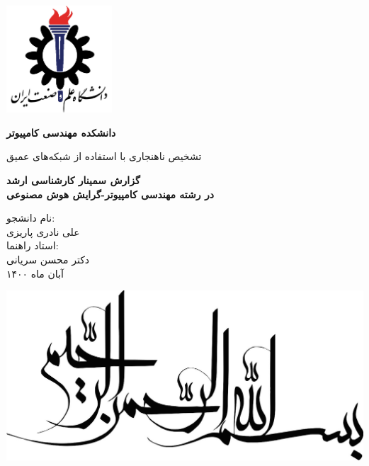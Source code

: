 \documentclass[12pt,a4paper]{article}
\theoremstyle{definition}
\theoremstyle{theorem}
\theoremstyle{definition}
\begin{document}
	\thispagestyle{empty}
	\vspace*{-25mm}
	\centerline{\includegraphics[height=4cm]{./images/logos/iust.png}}

	\begin{center}
	\textbf{
		دانشکده مهندسی کامپیوتر
	}
	\\[1cm]
	\baselineskip=2cm
	{\titr
	\begin{Huge}
	تشخیص ناهنجاری با استفاده از شبکه‌های عمیق\\[1cm]
	\end{Huge}}
	{\Large 
		\textbf{
			گزارش سمینار کارشناسی ارشد\\
			در رشته مهندسی کامپیوتر-گرایش هوش مصنوعی
		} \\[1cm]
	}

	{\Large {\traffic 
	نام دانشجو:
	}
	\\[.5cm]
	{\Large \nastaliq علی نادری پاریزی }
	\\
	{\Large\traffic  
		استاد راهنما:
	}}
	\\
	{\Large \nastaliq دکتر محسن سریانی}
	\\[.6cm]
	آبان ماه ۱۴۰۰
	\end{center}

	\newpage
		\begin{center}
		\includegraphics[scale=1]{./images/logos/in-the-name-of-god.jpeg}
		\end{center}
	\newpage
\end{document}
